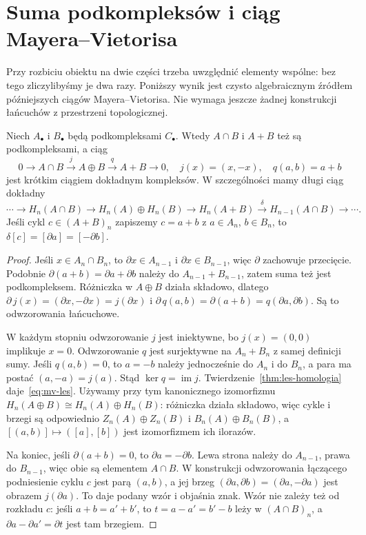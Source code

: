 \section{Suma podkompleksów i ciąg Mayera--Vietorisa}
\label{sec:mv-algebraiczny}

Przy rozbiciu obiektu na dwie części trzeba
uwzględnić elementy wspólne: bez tego
zliczylibyśmy je dwa razy. Poniższy wynik
jest czysto algebraicznym źródłem
późniejszych ciągów Mayera--Vietorisa.
Nie wymaga jeszcze żadnej konstrukcji
łańcuchów z przestrzeni topologicznej.

\begin{twierdzenie}
\label{thm:mv-algebraiczny}
Niech $A_\bullet$ i $B_\bullet$ będą
podkompleksami $C_\bullet$. Wtedy
$A\cap B$ i $A+B$ też są podkompleksami,
a ciąg
\begin{equation}\label{eq:mv-ses}
 0\longrightarrow A\cap B
 \xrightarrow{\ j\ }A\oplus B
 \xrightarrow{\ q\ }A+B
 \longrightarrow0,
 \quad j(x)=(x,-x),\quad q(a,b)=a+b
\end{equation}
jest krótkim ciągiem dokładnym kompleksów.
W szczególności mamy długi ciąg dokładny
\begin{equation}\label{eq:mv-les}
 \cdots\to H_n(A\cap B)\to H_n(A)\oplus H_n(B)
 \to H_n(A+B)\xrightarrow{\delta}
 H_{n-1}(A\cap B)\to\cdots.
\end{equation}
Jeśli cykl $c\in(A+B)_n$ zapiszemy
$c=a+b$ z $a\in A_n$, $b\in B_n$,
to $\delta[c]=[\partial a]=[-\partial b]$.
\end{twierdzenie}
\begin{proof}
Jeśli $x\in A_n\cap B_n$, to
$\partial x\in A_{n-1}$ i $\partial x\in B_{n-1}$,
więc $\partial$ zachowuje przecięcie.
Podobnie $\partial(a+b)=\partial a+\partial b$ należy do
$A_{n-1}+B_{n-1}$, zatem suma
też jest podkompleksem.
Różniczka w $A\oplus B$ działa
składowo, dlatego
$\partial\,j(x)=(\partial x,-\partial x)=j(\partial x)$ i
$\partial\,q(a,b)=\partial(a+b)=q(\partial a,\partial b)$.
Są to odwzorowania łańcuchowe.

W każdym stopniu odwzorowanie $j$ jest
iniektywne, bo $j(x)=(0,0)$
implikuje $x=0$. Odwzorowanie $q$ jest
surjektywne na $A_n+B_n$ z samej
definicji sumy. Jeśli $q(a,b)=0$,
to $a=-b$ należy jednocześnie do
$A_n$ i do $B_n$, a para ma postać
$(a,-a)=j(a)$. Stąd
$\ker q=\operatorname{im}j$.
Twierdzenie~\ref{thm:les-homologia}
daje~\eqref{eq:mv-les}. Używamy przy tym kanonicznego izomorfizmu
$H_n(A\oplus B)\cong H_n(A)\oplus H_n(B)$:
różniczka działa składowo, więc cykle i brzegi są odpowiednio
$Z_n(A)\oplus Z_n(B)$ i $B_n(A)\oplus B_n(B)$,
a $[(a,b)]\mapsto([a],[b])$ jest izomorfizmem ich ilorazów.

Na koniec, jeśli $\partial(a+b)=0$, to
$\partial a=-\partial b$. Lewa strona należy do
$A_{n-1}$, prawa do $B_{n-1}$,
więc obie są elementem $A\cap B$.
W konstrukcji odwzorowania łączącego
podniesienie cyklu $c$ jest parą $(a,b)$,
a jej brzeg $(\partial a,\partial b)=(\partial a,-\partial a)$
jest obrazem $j(\partial a)$. To daje
podany wzór i objaśnia znak. Wzór nie zależy też od
rozkładu $c$: jeśli $a+b=a'+b'$, to
$t=a-a'=b'-b$ leży w $(A\cap B)_n$, a
$\partial a-\partial a'=\partial t$ jest tam brzegiem.
\end{proof}

